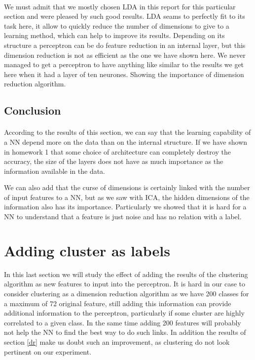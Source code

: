 \documentclass[twocolumn,a4paper,10pt]{article}
\begin{document}
\paragraph{}
We must admit that we mostly chosen LDA in this report for this particular section and were pleased by such good results. LDA seams to perfectly fit to its task here, it allow to quickly reduce the number of dimensions to give to a learning method, which can help to improve its results. Depending on its structure a perceptron can be do feature reduction in an internal layer, but this dimension reduction is not as efficient as the one we have shown here. We never managed to get a perceptron to have anything like similar to the results we get here when it had a layer of ten neurones. Showing the importance of dimension reduction algorithm.

\subsection{Conclusion}
\paragraph{}
According to the results of this section, we can say that the learning capability of a NN depend more on the data than on the internal structure. If we have shown in homework 1 that some choice of architecture can completely destroy the accuracy, the size of the layers does not have as much importance as the information available in the data.

We can also add that the curse of dimensions is certainly linked with the number of input features to a NN, but as we saw with ICA, the hidden dimensions of the information also has its importance. Particularly we showed that it is hard for a NN to understand that a feature is just noise and has no relation with a label.


\section{Adding cluster as labels}

In this last section we will study the effect of adding the results of the clustering algorithm as new features to input into the perceptron. It is hard in our case to consider clustering as a dimension reduction algorithm as we have 200 classes for a maximum of 72 original feature, still adding this information can provide additional information to the perceptron, particularly if some cluster are highly correlated to a given class. In the same time adding 200 features will probably not help the NN to find the best way to do such links. In addition the results of section \ref{dr} make us doubt such an improvement, as clustering do not look pertinent on our experiment.
\end{document}
